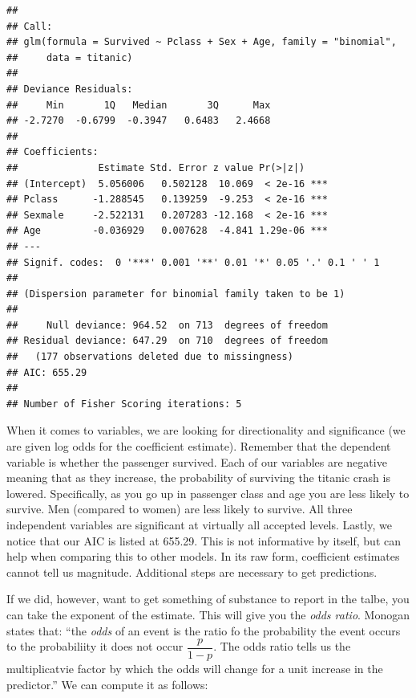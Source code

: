 \documentclass[]{book}
\newenvironment{Shaded}{\begin{snugshade}}{\end{snugshade}}
\newcommand{\KeywordTok}[1]{\textcolor[rgb]{0.13,0.29,0.53}{\textbf{#1}}}
\newcommand{\DecValTok}[1]{\textcolor[rgb]{0.00,0.00,0.81}{#1}}
\newcommand{\OperatorTok}[1]{\textcolor[rgb]{0.81,0.36,0.00}{\textbf{#1}}}
\newcommand{\NormalTok}[1]{#1}
\begin{document}
\begin{verbatim}
## 
## Call:
## glm(formula = Survived ~ Pclass + Sex + Age, family = "binomial", 
##     data = titanic)
## 
## Deviance Residuals: 
##     Min       1Q   Median       3Q      Max  
## -2.7270  -0.6799  -0.3947   0.6483   2.4668  
## 
## Coefficients:
##              Estimate Std. Error z value Pr(>|z|)    
## (Intercept)  5.056006   0.502128  10.069  < 2e-16 ***
## Pclass      -1.288545   0.139259  -9.253  < 2e-16 ***
## Sexmale     -2.522131   0.207283 -12.168  < 2e-16 ***
## Age         -0.036929   0.007628  -4.841 1.29e-06 ***
## ---
## Signif. codes:  0 '***' 0.001 '**' 0.01 '*' 0.05 '.' 0.1 ' ' 1
## 
## (Dispersion parameter for binomial family taken to be 1)
## 
##     Null deviance: 964.52  on 713  degrees of freedom
## Residual deviance: 647.29  on 710  degrees of freedom
##   (177 observations deleted due to missingness)
## AIC: 655.29
## 
## Number of Fisher Scoring iterations: 5
\end{verbatim}

When it comes to variables, we are looking for directionality and
significance (we are given log odds for the coefficient estimate).
Remember that the dependent variable is whether the passenger survived.
Each of our variables are negative meaning that as they increase, the
probability of surviving the titanic crash is lowered. Specifically, as
you go up in passenger class and age you are less likely to survive. Men
(compared to women) are less likely to survive. All three independent
variables are significant at virtually all accepted levels. Lastly, we
notice that our AIC is listed at 655.29. This is not informative by
itself, but can help when comparing this to other models. In its raw
form, coefficient estimates cannot tell us magnitude. Additional steps
are necessary to get predictions.

If we did, however, want to get something of substance to report in the
talbe, you can take the exponent of the estimate. This will give you the
\emph{odds ratio}. Monogan states that: ``the \emph{odds} of an event is
the ratio fo the probability the event occurs to the probabiliity it
does not occur \(\dfrac{p}{1- p}\). The odds ratio tells us the
multiplicatvie factor by which the odds will change for a unit increase
in the predictor.'' We can compute it as follows:

\begin{Shaded}
\end{Shaded}
\end{document}
